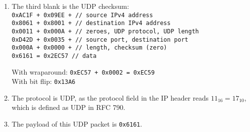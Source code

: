 \documentclass{report}
\begin{document}
\begin{problem}
\begin{answer}{30em}
\begin{enumerate}
    \item The third blank is the UDP checksum:\\
            \texttt{0xAC1F + 0x09EE + // source IPv4 address}\\
            \texttt{0x8061 + 0x8001 + // destination IPv4 address}\\
            \texttt{0x0011 + 0x000A + // zeroes, UDP protocol, UDP length } \\
            \texttt{0xD42D + 0x0035 + // source port, destination port } \\
            \texttt{0x000A + 0x0000 + // length, checksum (zero)} \\
            \texttt{0x6161 = 0x2EC57  // data}

          With wraparound: \texttt{0xEC57 + 0x0002 = 0xEC59}\\
          With bit flip: \texttt{0x13A6}

    \item The protocol is UDP, as the protocol field in the IP header reads
          $11_{16} = 17_{10}$, which is defined as UDP in RFC 790.

    \item The payload of this UDP packet is \texttt{0x6161}.
            
  \end{enumerate}
\end{answer}

\end{problem}
\end{document}
